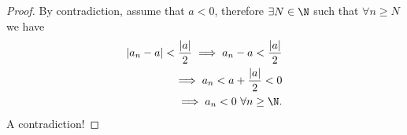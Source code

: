 \begin{proof}
        By contradiction, assume that $a < 0 $, therefore $\exists N \in \N$ such that $\forall n \ge  N$ we have
        \begin{align}
                \left|a_n - a\right| < \frac{\left|a\right|}{2} \implies a_n - a < \frac{\left|a\right|}{2} \\
                \implies a_n < a + \frac{\left|a\right|}{2} < 0 \\
                \implies a_n < 0 \text{ } \forall n \ge \N.
        \end{align}
        A contradiction!
\end{proof}




